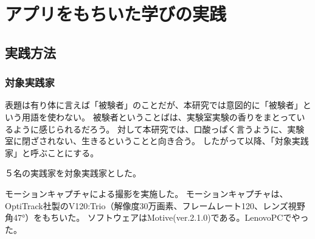 \chapter{アプリをもちいた学びの実践}

\section{実践方法}

\subsection{対象実践家}
表題は有り体に言えば「被験者」のことだが、本研究では意図的に「被験者」という用語を使わない。
被験者ということばは、実験室実験の香りをまとっているように感じられるだろう。
対して本研究では、口酸っぱく言うように、実験室に閉ざされない、生きるということと向き合う。
したがって以降、「対象実践家」と呼ぶことにする。

５名の実践家を対象実践家とした。

モーションキャプチャによる撮影を実施した。
モーションキャプチャは、OptiTrack社製のV120:Trio（解像度30万画素、フレームレート120、レンズ視野角47°）をもちいた。
ソフトウェアはMotive(ver.2.1.0)である。LenovoPCでやった。